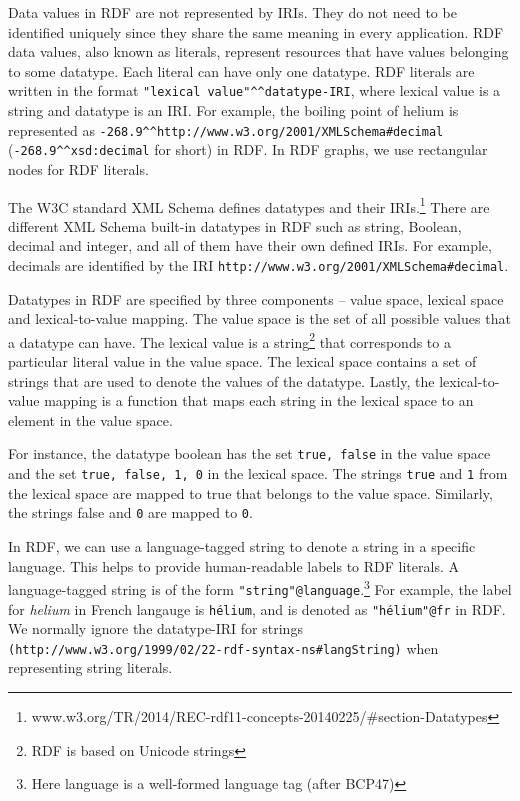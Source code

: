 Data values in RDF are not represented by IRIs. They do not need to be identified uniquely since they share the same meaning in every application. RDF data values, also known as literals, represent resources that have values belonging to some datatype. Each literal can have only one datatype. RDF literals are written in the format \texttt{"lexical value"\textasciicircum \textasciicircum datatype-IRI}, where lexical value is a string and datatype is an IRI. For example, the boiling point of helium is represented as \texttt{-268.9\textasciicircum \textasciicircum http://www.w3.org/2001/XMLSchema\#decimal} (\texttt{-268.9\textasciicircum \textasciicircum xsd:decimal} for short) in RDF. In RDF graphs, we use rectangular nodes for RDF literals.

The W3C standard XML Schema defines datatypes and their IRIs.\footnote{www.w3.org/TR/2014/REC-rdf11-concepts-20140225/\#section-Datatypes} There are different XML Schema built-in datatypes in RDF such as string, Boolean, decimal and integer, and all of them have their own defined IRIs. For example, decimals are identified by the IRI \texttt{http://www.w3.org/2001/XMLSchema\#decimal}. 

Datatypes in RDF are specified by three components – value space, lexical space and lexical-to-value mapping. The value space is the set of all possible values that a datatype can have. The lexical value is a string\footnote{RDF is based on Unicode strings} that corresponds to a particular literal value in the value space. The lexical space contains a set of strings that are used to denote the values of the datatype. Lastly, the lexical-to-value mapping is a function that maps each string in the lexical space to an element in the value space. 

For instance, the datatype boolean has the set \texttt{{true, false}} in the value space and the set \texttt{{true, false, 1, 0}} in the lexical space. The strings \texttt{true} and \texttt{1} from the lexical space are mapped to true that belongs to the value space. Similarly, the strings false and \texttt{0} are mapped to \texttt{0}.

In RDF, we can use a language-tagged string to denote a string in a specific language. This helps to provide human-readable labels to RDF literals. A language-tagged string is of the form \texttt{"string"@language}.\footnote{Here language is a well-formed language tag (after BCP47)} For example, the label for \textit{helium} in French langauge is \texttt{hélium}, and is denoted as \texttt{"hélium"@fr} in RDF. We normally ignore the datatype-IRI for strings \texttt{(http://www.w3.org/1999/02/22-rdf-syntax-ns\#langString)} when representing string literals. 

